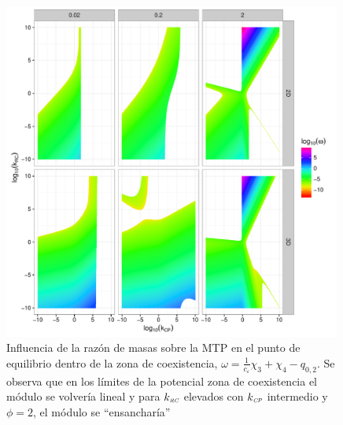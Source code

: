 \begin{figure}[!htbp]
  \centering
  \includegraphics[width = 0.99\textwidth]{./Plots/MTPvar.pdf}
  \caption[MTP]{Influencia de la raz\'on de masas sobre la MTP en el punto de equilibrio dentro de la zona de coexistencia, $\omega = \frac{1}{c_\varepsilon} \chi_3 + \chi_4  - q_{0,2}$. Se observa que en los l\'imites de la potencial zona de coexistencia el m\'odulo se volver\'ia lineal y para $k_{\textit{\tiny RC}}$ elevados con $k_{\textit{\tiny CP}}$ intermedio y $\phi = 2$, el m\'odulo se ``ensanchar\'ia''}
  \label{fig:MTPvar}
\end{figure}

